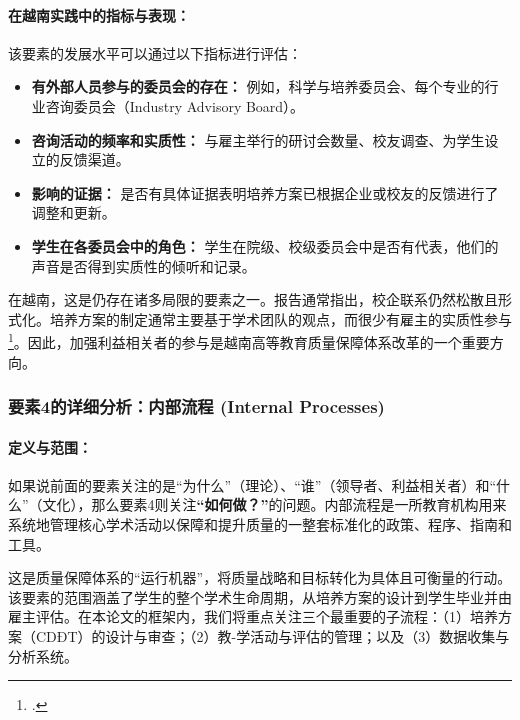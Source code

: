 \paragraph{在越南实践中的指标与表现：}
该要素的发展水平可以通过以下指标进行评估：
\begin{itemize}
    \item \textbf{有外部人员参与的委员会的存在：} 例如，科学与培养委员会、每个专业的行业咨询委员会（Industry Advisory Board）。
    \item \textbf{咨询活动的频率和实质性：} 与雇主举行的研讨会数量、校友调查、为学生设立的反馈渠道。
    \item \textbf{影响的证据：} 是否有具体证据表明培养方案已根据企业或校友的反馈进行了调整和更新。
    \item \textbf{学生在各委员会中的角色：} 学生在院级、校级委员会中是否有代表，他们的声音是否得到实质性的倾听和记录。
\end{itemize}
在越南，这是仍存在诸多局限的要素之一。报告通常指出，校企联系仍然松散且形式化。培养方案的制定通常主要基于学术团队的观点，而很少有雇主的实质性参与\footcite{CommonFailureCriteria}。因此，加强利益相关者的参与是越南高等教育质量保障体系改革的一个重要方向。




\subsubsection{要素4的详细分析：内部流程 (Internal Processes)}
\label{subsubsec:thanh_to_4}

\paragraph{定义与范围：}
如果说前面的要素关注的是“为什么”（理论）、“谁”（领导者、利益相关者）和“什么”（文化），那么要素4则关注\textbf{“如何做？”}的问题。内部流程是一所教育机构用来系统地管理核心学术活动以保障和提升质量的一整套标准化的政策、程序、指南和工具。

这是质量保障体系的“运行机器”，将质量战略和目标转化为具体且可衡量的行动。该要素的范围涵盖了学生的整个学术生命周期，从培养方案的设计到学生毕业并由雇主评估。在本论文的框架内，我们将重点关注三个最重要的子流程：（1）培养方案（CDĐT）的设计与审查；（2）教-学活动与评估的管理；以及（3）数据收集与分析系统。


